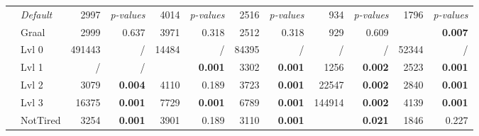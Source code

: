 \begin{table*}
{\begin{tabular}{cl|rr|rr|rr|rr|rr|}
                & \em Default  & 2997                    & \em p-values               & 4014                      & \em p-values                  & 2516                   & \em p-values & 934       & \em p-values & 1796       & \em p-values \\
                & Graal        & 2999                    & 0.637                      & 3971                      & 0.318                         & 2512                   & 0.318        & 929       & 0.609        & \best 1662 & \bf 0.007    \\
                & Lvl 0        & 491443                  & /                          & 14484                     & /                             & 84395                  & /            & /         & /            & 52344      & /            \\
                & Lvl 1        & /                       & /                          & \best 3731                & \bf 0.001                     & 3302                   & \bf 0.001    & 1256      & \bf 0.002    & 2523       & \bf 0.001    \\
                & Lvl 2        & 3079                    & \bf 0.004                  & 4110                      & 0.189                         & 3723                   & \bf 0.001    & 22547     & \bf 0.002    & 2840       & \bf 0.001    \\
                & Lvl 3        & 16375                   & \bf 0.001                  & 7729                      & \bf 0.001                     & 6789                   & \bf 0.001    & 144914    & \bf 0.002    & 4139       & \bf 0.001    \\
                & NotTired     & 3254                    & \bf 0.001                  & 3901                      & 0.189                         & 3110                   & \bf 0.001    & \best 912 & \bf 0.021    & 1846       & 0.227        \\

            \bottomrule
        \end{tabular}
    }


\end{table*}
